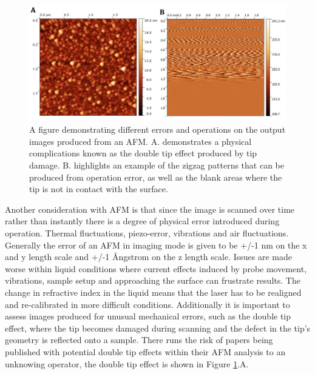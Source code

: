 \begin{figure}[h!]     %
        \begin{center}
          \includegraphics[width=140mm]{chapter2/Error.png}
\end{center}
\caption{A figure demonstrating different errors and operations on the output images produced from an AFM.  A.  demonstrates  a  physical  complications  known  as  the double tip effect produced by tip damage.  B. highlights an example of the zigzag patterns that can be produced from operation error, as well as the blank areas where the tip is not in contact with the surface.  }
\label{fig:Errorr}                 %
\end{figure}

Another consideration with AFM is that since the image is scanned over time rather than instantly there is a degree of physical error introduced during operation. Thermal fluctuations, piezo-error, vibrations and air fluctuations. Generally the error of an AFM in imaging mode is given to be +/-1 nm on the x and y length scale and +/-1 \AA{}ngstrom on the z length scale. Issues are made worse within liquid conditions where current effects induced by probe movement, vibrations, sample setup and approaching the surface can frustrate results. The change in refractive index in the liquid means that the laser has to be realigned and re-calibrated in more difficult conditions. Additionally it is important to assess images produced for unusual mechanical errors, such as the double tip effect, where the tip becomes damaged during scanning and the defect in the tip's geometry is reflected onto a sample. There runs the risk of papers being published with potential double tip effects within their AFM analysis to an unknowing operator, the double tip effect is shown in Figure \ref{fig:Errorr}.A.

